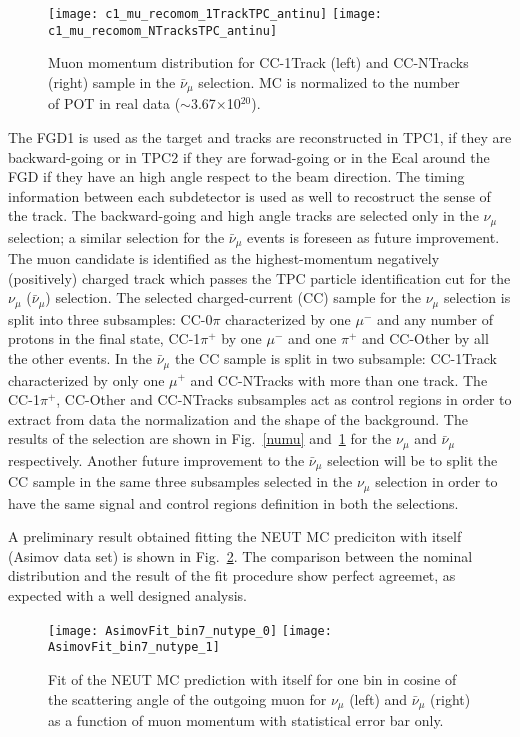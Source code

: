 \documentclass[12pt]{article}
\begin{document}
\begin{figure}[htbp]
	\centering
	\texttt{[image: c1\_mu\_recomom\_1TrackTPC\_antinu]}
	\texttt{[image: c1\_mu\_recomom\_NTracksTPC\_antinu]}
	\caption{Muon momentum distribution for CC-1Track (left) and CC-NTracks (right) sample in the $\bar{\nu}_\mu$ selection. MC is normalized to the number of POT in real data ($\sim$3.67$\times$10$^{20}$).}\label{antinumu}
\end{figure}
\noindent
The FGD1 is used as the target and tracks are reconstructed in TPC1, if they are backward-going or in TPC2 if they are forwad-going or in the Ecal around the FGD if they have an high angle respect to the beam direction. The timing information between each subdetector is used as well to recostruct the sense of the track. The backward-going and high angle tracks are selected only in the $\nu_\mu$ selection; a similar selection for the $\bar{\nu}_\mu$ events is foreseen as future improvement. The muon candidate is identified as the highest-momentum negatively (positively) charged track which passes the TPC particle identification cut for the $\nu_\mu$ ($\bar{\nu}_\mu$) selection. The selected charged-current (CC) sample for the $\nu_\mu$ selection is split into three subsamples: CC-0$\pi$ characterized by one $\mu^-$ and any number of protons in the final state, CC-1$\pi^+$ by one $\mu^-$ and one $\pi^+$ and CC-Other by all the other events. In the $\bar{\nu}_\mu$ the CC sample is split in two subsample: CC-1Track characterized by only one $\mu^+$ and CC-NTracks with more than one track. The CC-1$\pi^+$, CC-Other and CC-NTracks subsamples act as control regions in order to extract from data the normalization and the shape of the background. The results of the selection are shown in Fig.~\ref{numu} and~\ref{antinumu} for the  $\nu_\mu$ and $\bar{\nu}_\mu$ respectively. Another future improvement to the $\bar{\nu}_\mu$ selection will be to split the CC sample in the same three subsamples selected in the $\nu_\mu$ selection in order to have the same signal and control regions definition in both the selections.

\noindent
A preliminary result obtained fitting the NEUT MC prediciton with itself (Asimov data set) is shown in Fig.~\ref{fig:asimovfit}. The comparison between the nominal distribution and the result of the fit procedure show perfect agreemet, as expected with a well designed analysis. 

\begin{figure}[htbp]
\centering
\texttt{[image: AsimovFit\_bin7\_nutype\_0]}
\texttt{[image: AsimovFit\_bin7\_nutype\_1]}
\caption{Fit of the NEUT MC prediction with itself for one bin in cosine of the scattering angle of the outgoing muon for $\nu_\mu$ (left) and $\bar{\nu}_\mu$ (right) as a function of muon momentum with statistical error bar only.}\label{fig:asimovfit}
\end{figure}
\end{document}
